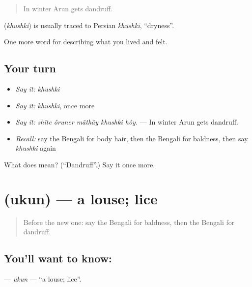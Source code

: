 \begin{quote}
In winter Arun gets dandruff.
\end{quote}

\begin{cousinweb}
\textbf{} (\emph{khushki}) is usually traced to Persian \emph{khushkī}, \textquotedblleft{}dryness\textquotedblright{}.
\end{cousinweb}

\begin{grammarlens}[title={What you've built}]
One more word for describing what you lived and felt.
\end{grammarlens}

\subsection*{Your turn}
\begin{itemize}
\raggedright
  \item \emph{Say it:} \emph{khushki}
  \item \emph{Say it:} \emph{khushki}, once more
  \item \emph{Say it:} \emph{shīte ôruner māthāy khushki hôy.} — In winter Arun gets dandruff.
  \item \emph{Recall:} say the Bengali for body hair, then the Bengali for baldness, then say \emph{khushki} again
\end{itemize}

\begin{tcolorbox}[breakable,colback=teal!4,colframe=teal!35!black,title={Before you move on}]
What does  mean? (\textquotedblleft{}Dandruff\textquotedblright{}.) Say it once more.
\end{tcolorbox}
\section[\texorpdfstring{\bn{উকুন} (ukun)}{উকুন (ukun)}]{ (ukun) — a louse; lice}

\label{lesson:BN-C470-ukun}



\begin{quote}
Before the new one: say the Bengali for baldness, then the Bengali for dandruff.
\end{quote}

\subsection*{You'll want to know: }
\textbf{} — \emph{ukun} — \textquotedblleft{}a louse; lice\textquotedblright{}.

